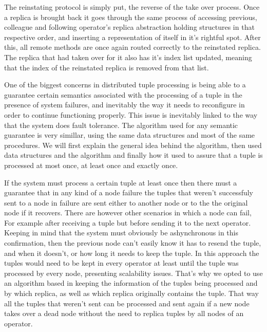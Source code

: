 \documentclass[times, 10pt,twocolumn]{article}
\begin{document}
The reinstating protocol is simply put, the reverse of the take over process. Once a replica is brought back it goes through the same process of accessing previous, colleague and following operator's replica abstraction holding structures in that respective order, and inserting a representation of itself in it's rightful spot.
After this, all remote methods are once again routed correctly to the reinstated replica.
The replica that had taken over for it also has it's index list updated, meaning that the index of the reinstated replica is removed from that list.

One of the biggest concerns in distributed tuple processing is being
able to a guarantee certain semantics associated with the processing of
a tuple in the presence of system failures, and inevitably the way it
needs to reconfigure in order to continue functioning properly. This issue
is inevitably linked to the way that the system does fault tolerance. The
algorithm used for any semantic guarantee is very simillar, using the same
data structures and most of the same procedures. We will first explain the
general idea behind the algorithm, then used data structures and the
algorithm and finally how it used to assure that a tuple is processed at
most once, at least once and exactly once.



If the system must process a certain tuple at least once then there must a
guarantee that in any kind of a node failure the tuples that weren't
successfuly sent to a node in failure are sent either to another node or
to the the original node if it recovers. There are however other scenarios
in which a node can fail, For example after receiving a tuple but before
sending it to the next operator. Keeping in mind that the system must
obviously be ashynchronous in this confirmation, then the previous node
can't easily know it has to resend the tuple, and when it doesn't, or how
long it needs to keep the tuple.  In this approach the tuples would need
to be kept in every operator at least until the tuple was processed by
every node, presenting scalability issues. That's why we opted to use an
algorithm based in keeping the information of the tuples being processed
and by which replica, as well as which replica originally contains the
tuple.  That way all the tuples that weren't sent can be processed and
sent again if a new node takes over a dead node without the need to
replica tuples by all nodes of an operator.
\end{document}
